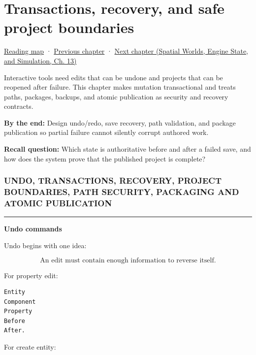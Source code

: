 \chapter{Transactions, recovery, and safe project boundaries}\label{05-engine-i-ch012-transactions-recovery-and-safe-project-boundaries}\hypertarget{05-engine-i-ch012}{}\label{stagechapter:05-engine-i-ch012}

\hyperref[volume-reading-map]{Reading map} · \hyperref[05-engine-i-ch011-streaming-resources-through-explicit-states]{Previous chapter} · \href{../05-Spatial-Worlds-Engine-State-and-Simulation/main.pdf\#nameddest=05-engine-i-ch013-portable-startup-windows-events-and-input}{Next chapter (Spatial Worlds, Engine State, and Simulation, Ch. 13)}

Interactive tools need edits that can be undone and projects that can be reopened after failure. This chapter makes mutation transactional and treats paths, packages, backups, and atomic publication as security and recovery contracts.

\textbf{By the end:} Design undo/redo, save recovery, path validation, and package publication so partial failure cannot silently corrupt authored work.

\textbf{Recall question:} Which state is authoritative before and after a failed save, and how does the system prove that the published project is complete?

\subsection{UNDO, TRANSACTIONS, RECOVERY, PROJECT BOUNDARIES, PATH SECURITY, PACKAGING AND ATOMIC PUBLICATION}\label{05-engine-i-ch012-undo-transactions-recovery-project-boundaries-path-security-packaging-and-atomic-publication}

\begin{center}\rule{0.5\linewidth}{0.5pt}\end{center}

\textbf{Undo commands}

Undo begins with one idea:

\[
\boxed{
\text{An edit must contain enough information to reverse itself.}
}
\]

For property edit:

\begin{verbatim}
Entity
Component
Property
Before
After.
\end{verbatim}

For create entity:

